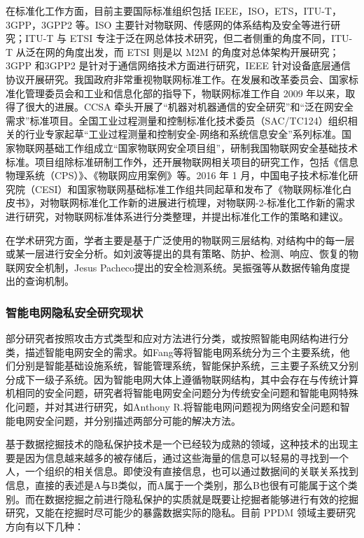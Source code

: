 \documentclass[10.5pt,twocolumn]{jbuaa}
\begin{document}
在标准化工作方面，目前主要国际标准组织包括 IEEE，ISO，ETS，ITU-T，3GPP，3GPP2 等。ISO 主要针对物联网、传感网的体系结构及安全等进行研究；ITU-T 与 ETSI 专注于泛在网总体技术研究，但二者侧重的角度不同，ITU-T 从泛在网的角度出发，而 ETSI 则是以 M2M 的角度对总体架构开展研究；3GPP 和3GPP2 是针对于通信网络技术方面进行研究，IEEE 针对设备底层通信协议开展研究。我国政府非常重视物联网标准工作。在发展和改革委员会、国家标准化管理委员会和工业和信息化部的指导下，物联网标准工作自 2009 年以来，取得了很大的进展。CCSA 牵头开展了“机器对机器通信的安全研究”和“泛在网安全需求”标准项目。全国工业过程测量和控制标准化技术委员（SAC/TC124）组织相关的行业专家起草“工业过程测量和控制安全-网络和系统信息安全”系列标准。国家物联网基础工作组成立“国家物联网安全项目组”，研制我国物联网安全基础技术标准。项目组除标准研制工作外，还开展物联网相关项目的研究工作，包括《信息物理系统（CPS）》、《物联网应用案例》等。2016 年 1 月，中国电子技术标准化研究院（CESI）和国家物联网基础标准工作组共同起草和发布了《物联网标准化白皮书》，对物联网标准化工作新的进展进行梳理，对物联网-2-标准化工作新的需求进行研究，对物联网标准体系进行分类整理，并提出标准化工作的策略和建议。

在学术研究方面，学者主要是基于广泛使用的物联网三层结构, 对结构中的每一层或某一层进行安全分析。如刘波等提出的具有策略、防护、检测、响应、恢复的物联网安全机制，Jesus Pacheco提出的安全检测系统。吴振强等从数据传输角度提出的查询机制。

\subsubsection{智能电网隐私安全研究现状}
部分研究者按照攻击方式类型和应对方法进行分类，或按照智能电网结构进行分类，描述智能电网安全的需求。如Fang等将智能电网系统分为三个主要系统，他们分别是智能基础设施系统，智能管理系统，智能保护系统，三主要子系统又分别分成下一级子系统。因为智能电网大体上遵循物联网结构，其中会存在与传统计算机相同的安全问题，研究者将智能电网安全问题分为传统安全问题和智能电网特殊化问题，并对其进行研究，如Anthony R.将智能电网问题视为网络安全问题和智能电网安全问题，并分别描述两部分可能的解决方法。

基于数据挖掘技术的隐私保护技术是一个已经较为成熟的领域，这种技术的出现主要是因为信息越来越多的被存储后，通过这些海量的信息可以轻易的寻找到一个人，一个组织的相关信息。即使没有直接信息，也可以通过数据间的关联关系找到信息，直接的表述是A与B类似，而A属于一个类别，那么B也很有可能属于这个类别。而在数据挖掘之前进行隐私保护的实质就是既要让挖掘者能够进行有效的挖掘研究，又能在挖掘时尽可能少的暴露数据实际的隐私。目前 PPDM 领域主要研究方向有以下几种：
\end{document}
